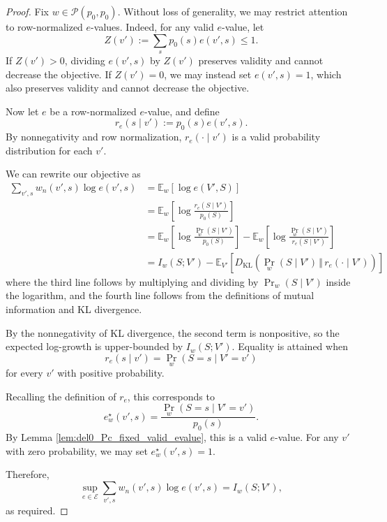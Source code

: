 \documentclass[12pt]{article}
\newcommand{\DKL}{D_{\mathrm{KL}}}
\newcommand{\E}{\mathbb{E}}
\theoremstyle{plain}
\theoremstyle{definition}
\begin{document}
\begin{proof}
Fix $w\in\mathcal{P}(p_0,p_0)$. Without loss of generality, we may restrict attention to row-normalized $e$-values. Indeed, for any valid
$e$-value, let
\begin{equation}
Z(v'):=\sum_s p_0(s)e(v',s)\leq 1.
\end{equation}
If $Z(v')>0$, dividing $e(v',s)$ by $Z(v')$ preserves validity and cannot decrease the objective. If $Z(v')=0$, we may instead set $e(v',s)=1$, which also preserves validity and cannot decrease the objective.

Now let $e$ be a row-normalized $e$-value, and define
\begin{equation}
    r_e(s\mid v'):=p_0(s)e(v',s).
\end{equation}
By nonnegativity and row normalization, $r_e(\cdot\mid v')$ is a valid probability distribution for each $v'$.

We can rewrite our objective as
\begin{align}
\sum_{v',s}w_n(v',s)\log e(v',s)
&=\E_w[\log e(V',S)]\\
&=\E_w\left[
    \log\frac{r_e(S\mid V')}{p_0(S)}
\right]\\
&=\E_w\left[
    \log\frac{\Pr_w(S\mid V')}{p_0(S)}
\right]
-\E_w\left[
    \log\frac{\Pr_w(S\mid V')}{r_e(S\mid V')}
\right]\\
&=I_w(S;V')
-\E_{V'}\left[
    \DKL\left(
        \Pr_w(S\mid V')
        \,\Vert\,r_e(\cdot\mid V')
    \right)
\right]
\end{align}
where the third line follows by multiplying and dividing by $\Pr_w(S\mid V')$ inside the logarithm, and the fourth line follows from the definitions of mutual information and KL divergence.

By the nonnegativity of KL divergence, the second term is nonpositive, so the expected log-growth is upper-bounded by $I_w(S;V')$.
Equality is attained when
\begin{equation}
    r_e(s\mid v')=\Pr_w(S=s\mid V'=v')
\end{equation}
for every $v'$ with positive probability.

Recalling the definition of $r_e$, this corresponds to
\begin{equation}
    e_w^\star(v',s)
    =\frac{\Pr_w(S=s\mid V'=v')}{p_0(s)}.
\end{equation}
By Lemma \ref{lem:del0_Pc_fixed_valid_evalue}, this is a valid $e$-value. For any $v'$ with zero probability, we may set $e_w^\star(v',s)=1$.

Therefore,
\begin{equation}
\sup_{e\in\mathcal E}
\sum_{v',s}w_n(v',s)\log e(v',s)
=I_w(S;V'),
\end{equation}
as required.
\end{proof}
\end{document}
